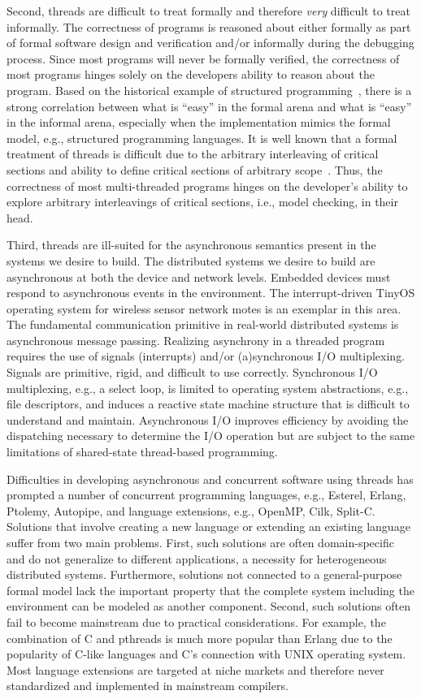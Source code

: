 \documentclass[letterpaper]{article}
\begin{document}
Second, threads are difficult to treat formally and therefore \emph{very} difficult to treat informally.
The correctness of programs is reasoned about either formally as part of formal software design and verification and/or informally during the debugging process.
Since most programs will never be formally verified, the correctness of most programs hinges solely on the developers ability to reason about the program.
Based on the historical example of structured programming~\cite{goto_considered_harmful}, there is a strong correlation between what is ``easy'' in the formal arena and what is ``easy'' in the informal arena, especially when the implementation mimics the formal model, e.g., structured programming languages.
It is well known that a formal treatment of threads is difficult due to the arbitrary interleaving of critical sections and ability to define critical sections of arbitrary scope~\cite{lee_threads}.
Thus, the correctness of most multi-threaded programs hinges on the developer's ability to explore arbitrary interleavings of critical sections, i.e., model checking, in their head.

Third, threads are ill-suited for the asynchronous semantics present in the systems we desire to build.
The distributed systems we desire to build are asynchronous at both the device and network levels.
Embedded devices must respond to asynchronous events in the environment.
The interrupt-driven TinyOS operating system for wireless sensor network motes is an exemplar in this area.
The fundamental communication primitive in real-world distributed systems is asynchronous message passing.
Realizing asynchrony in a threaded program requires the use of signals (interrupts) and/or (a)synchronous I/O multiplexing.
Signals are primitive, rigid, and difficult to use correctly.
Synchronous I/O multiplexing, e.g., a select loop, is limited to operating system abstractions, e.g., file descriptors, and induces a reactive state machine structure that is difficult to understand and maintain.
Asynchronous I/O improves efficiency by avoiding the dispatching necessary to determine the I/O operation but are subject to the same limitations of shared-state thread-based programming.

Difficulties in developing asynchronous and concurrent software using threads has prompted a number of concurrent programming languages, e.g., Esterel, Erlang, Ptolemy, Autopipe, and language extensions, e.g., OpenMP, Cilk, Split-C.
Solutions that involve creating a new language or extending an existing language suffer from two main problems.
First, such solutions are often domain-specific and do not generalize to different applications, a necessity for heterogeneous distributed systems.
Furthermore, solutions not connected to a general-purpose formal model lack the important property that the complete system including the environment can be modeled as another component.
Second, such solutions often fail to become mainstream due to practical considerations.
For example, the combination of C and pthreads is much more popular than Erlang due to the popularity of C-like languages and C's connection with UNIX operating system.
Most language extensions are targeted at niche markets and therefore never standardized and implemented in mainstream compilers.
\end{document}
